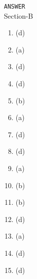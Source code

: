 \documentclass{article}
\begin{document}
\pagebreak
\begin{center}
\texttt{ANSWER}\\Section-B
\end{center}
\begin{enumerate}
\item (d)
\item (a)
\item (d)
\item (d)
\item (b)
\item (a)
\item (d)
\item (d)
\item (a)
\item (b)
\item (b)
\item (d)
\item (a)
\item (d)
\item (d)
\end{enumerate}
\end{document}
